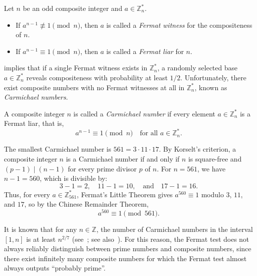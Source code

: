\begin{definition}
    Let \(n\) be an odd composite integer and \(a \in \mathbb{Z}_n^*\).
    \begin{itemize}
        \item If \(a^{n-1} \not\equiv 1 \pmod{n}\), then \(a\) is called a \emph{Fermat witness} for the compositeness of \(n\).
        \item If \(a^{n-1} \equiv 1 \pmod{n}\), then \(a\) is called a \emph{Fermat liar} for \(n\).
    \end{itemize}
\end{definition}

 implies that if a single Fermat witness exists in \(\mathbb{Z}_n^*\), a randomly selected base \(a \in \mathbb{Z}_n^*\) reveals compositeness with probability at least \(1/2\).
Unfortunately, there exist composite numbers with no Fermat witnesses at all in \(\mathbb{Z}_n^*\), known as \emph{Carmichael numbers}.

\begin{definition}
    A composite integer \(n\) is called a \emph{Carmichael number} if every element \(a \in \mathbb{Z}_n^*\) is a Fermat liar, that is,
    \[
        a^{n-1} \equiv 1 \pmod{n} \quad \text{for all } a \in \mathbb{Z}_n^*.
    \]
\end{definition}

\begin{example}
    The smallest Carmichael number is \(561 = 3 \cdot 11 \cdot 17\).
    By Korselt's criterion, a composite integer \(n\) is a Carmichael number if and only if \(n\) is square-free and \((p - 1) \mid (n - 1)\) for every prime divisor \(p\) of \(n\).
    For \(n = 561\), we have \(n - 1 = 560\), which is divisible by:
    \[
        3 - 1 = 2, \quad 11 - 1 = 10, \quad \text{and} \quad 17 - 1 = 16.
    \]
    Thus, for every \(a \in \mathbb{Z}_{561}^*\), Fermat's Little Theorem gives \(a^{560} \equiv 1\) modulo \(3\), \(11\), and \(17\), so by the Chinese Remainder Theorem,
    \[
        a^{560} \equiv 1 \pmod{561}.
    \]
\end{example}

\begin{remark}
    It is known that for any \(n \in \mathbb{Z}\), the number of Carmichael numbers in the interval \([1, n]\) is at least \(n^{2/7}\) (see~\cite{Harman2005}; see also~\cite{AlfordGranvillePomerance1994}).
    For this reason, the Fermat test does not always reliably distinguish between prime numbers and composite numbers, since there exist infinitely many composite numbers for which the Fermat test almost always outputs ``probably prime''.
\end{remark}